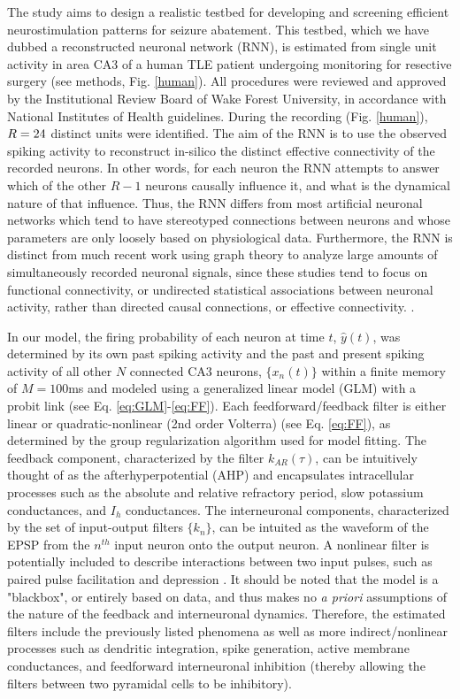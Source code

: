 \documentclass[11pt,a4paper,final]{article}
\begin{document}
The study aims to design a realistic testbed for developing and screening efficient neurostimulation patterns for seizure abatement.
This testbed, which we have dubbed a reconstructed neuronal network (RNN), is estimated from single unit activity in area CA3 of a human TLE patient undergoing monitoring for resective surgery (see methods, Fig. \ref{human}).
All procedures were reviewed and approved by the Institutional Review Board of Wake Forest University, in accordance with National Institutes of Health guidelines.
During the recording (Fig. \ref{human}), $R=24{}$ distinct units were identified.
The aim of the RNN is to use the observed spiking activity to reconstruct in-silico the distinct effective connectivity of the \nn{} recorded neurons.
In other words, for each neuron the RNN attempts to answer which of the other $R-1$ neurons causally influence it, and what is the dynamical nature of that influence.
Thus, the RNN differs from most artificial neuronal networks which tend to have stereotyped connections between neurons and whose parameters are only loosely based on physiological data.
Furthermore, the RNN is distinct from much recent work using graph theory to analyze large amounts of simultaneously recorded neuronal signals, since these studies tend to focus on functional connectivity, or undirected statistical associations between neuronal activity, rather than directed causal connections, or effective connectivity. \citep{sporns09,yaffe15}.

In our model, the firing probability of each neuron at time $t$, $\hat{y}(t)$, was determined by its own past spiking activity and the past and present spiking activity of all other $N$ connected CA3 neurons, $\{x_n(t)\}$ within a finite memory of $M=100$ms and modeled using a generalized linear model (GLM) with a probit link (see Eq. \ref{eq:GLM}-\ref{eq:FF}).
Each feedforward/feedback filter is either linear or quadratic-nonlinear (2nd order Volterra)  (see Eq. \ref{eq:FF}), as determined by the group regularization algorithm used for model fitting.
The feedback component, characterized by the filter $k_{AR}(\tau)$, can be intuitively thought of as the afterhyperpotential (AHP) \citep{spruston07} and encapsulates intracellular processes such as the absolute and relative refractory period, slow potassium conductances, and $I_h$ conductances.
The interneuronal components, characterized by the set of input-output filters $\{k_n\}$, can be intuited as the waveform of the EPSP from the $n^{th}$ input neuron onto the output neuron.
A nonlinear filter is potentially included to describe interactions between two input pulses, such as paired pulse facilitation and depression \citep{song09par1,sandler15}.
It should be noted that the model is a "blackbox", or entirely based on data, and thus makes no \textit{a priori} assumptions of the nature of the feedback and interneuronal dynamics.
Therefore, the estimated filters include the previously listed phenomena as well as more indirect/nonlinear processes such as dendritic integration, spike generation, active membrane conductances, and feedforward interneuronal inhibition (thereby allowing the filters between two pyramidal cells to be inhibitory).
\end{document}
